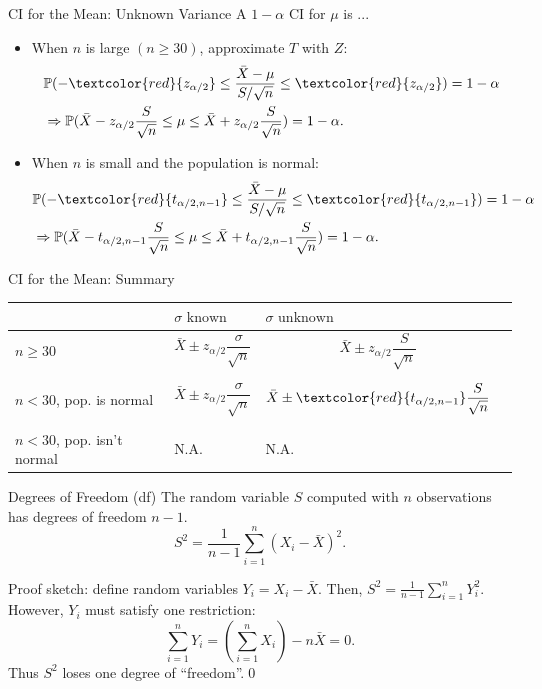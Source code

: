 \documentclass{beamer}
\newcommand{\pr}{\mathbb{P}}
\let\thefootnote\relax\footnotetext{\tiny{*  Office Hours: Wed \& Fri 10:00 - 11:30 AM, KMC 8-174}}
\begin{document}
\begin{frame}{CI for the Mean: Unknown Variance}
A $1-\alpha$ CI for $\mu$ is ...
\begin{itemize}
\item When $n$ is large $(n\geq 30)$, approximate $T$ with $Z$:
\begin{align*}
 & \pr(-\textcolor{red}{z_{\alpha/2}} \leq \frac{\bar X - \mu}{S/\sqrt{n}} \leq \textcolor{red}{z_{\alpha/2}})=1-\alpha \\
& \Rightarrow \pr(\bar X -{z_{\alpha/2}} \frac{S}{\sqrt{n}} \leq \mu \leq \bar X +{z_{\alpha/2}} \frac{S}{\sqrt{n}})=1-\alpha.
\end{align*}
\item When $n$ is small and the population is normal:
\begin{align*}
 & \pr(-\textcolor{red}{t_{\alpha/2,n-1}} \leq \frac{\bar X - \mu}{S/\sqrt{n}} \leq \textcolor{red}{t_{\alpha/2,n-1}})=1-\alpha \\
& \Rightarrow \pr(\bar X -{t_{\alpha/2,n-1}} \frac{S}{\sqrt{n}} \leq \mu \leq \bar X +{t_{\alpha/2,n-1}} \frac{S}{\sqrt{n}})=1-\alpha.
\end{align*}
\end{itemize}
\end{frame}

\begin{frame}{CI for the Mean: Summary}
 \begin{table}
 \begin{center}
 \begin{tabular}{|M{3cm}|M{3cm}|M{3cm}|N}
 \hline
  & $\sigma \text{ known}$ & $\sigma \text{ unknown}$ \\[5pt]\hline
 $n\geq 30$ & 
$$ \bar X \pm z_{\alpha/2} \frac{\sigma}{\sqrt{n}}$$ & 
$$ \bar X \pm z_{\alpha/2} \frac{S}{\sqrt{n}}$$  \\[20pt] \hline
 $n< 30$, pop. is normal &  
$$ \bar X \pm z_{\alpha/2} \frac{\sigma}{\sqrt{n}} $$& 
$$ \bar X \pm \textcolor{red}{t_{\alpha/2,n-1}} \frac{S}{\sqrt{n}}$$  \\ [20pt]\hline
$n< 30$, pop. isn't normal & 
 N.A. & N.A. \\ \hline
 \end{tabular}
 \end{center}
 \end{table}
\end{frame}

\begin{frame}{Degrees of Freedom (df)}
The random variable $S$ computed with $n$ observations has degrees of freedom $n-1$.
\[
S^2 = \frac{1}{n-1} \sum_{i=1}^n (X_i - \bar X)^2.
\]

Proof sketch: define random variables $Y_i = X_i - \bar X$. Then,
$S^2 = \frac{1}{n-1} \sum_{i=1}^n Y_i^2$.
However, $Y_i$ must satisfy one restriction: 
\[\sum_{i=1}^n Y_i = (\sum_{i=1}^n X_i) - n \bar X = 0.
\]
Thus $S^2$ loses one degree of ``freedom''.\qed

\let\thefootnote\relax{}
\end{frame}
\end{document}
